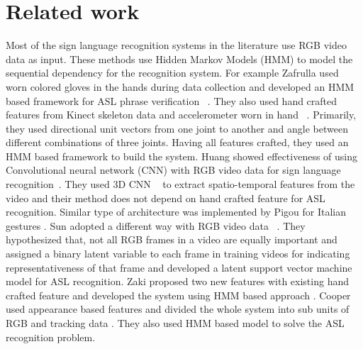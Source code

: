 \documentclass[10pt,twocolumn,letterpaper]{article}
\begin{document}
\section{Related work}
Most of the sign language recognition systems in the literature use RGB video data as input. These methods use Hidden Markov Models (HMM) to model the sequential dependency for the recognition system. For example Zafrulla \etal used worn colored gloves in the hands during data collection and developed an HMM based framework for ASL phrase verification ~\cite{copycat_zafrulla}. They also used hand crafted features from Kinect skeleton data and accelerometer worn in hand ~\cite{Zafrulla:2011:ASL:2070481.2070532}. Primarily, they used directional unit vectors from one joint to another and angle between different combinations of three joints. Having all features crafted, they used an HMM based framework to build the system. Huang \etal showed effectiveness of using Convolutional neural network (CNN) with RGB video data for sign language recognition~\cite{7177428}. They used 3D CNN ~\cite{Ji:2013:CNN:2412386.2412939} to extract spatio-temporal features from the video and their method does not depend on hand crafted feature for ASL recognition. Similar type of architecture was implemented by Pigou \etal for Italian gestures \cite{978-3-319-16178-5_40}. Sun \etal adopted a different way with RGB video data ~\cite{Sun:2015:LSV:2753829.2629481}. They hypothesized that, not all RGB frames in a video are equally important and assigned a binary latent variable to each frame in training videos for indicating representativeness of that frame and developed a latent support vector machine model for ASL recognition. Zaki \etal proposed two new features with existing hand crafted feature and developed the system using HMM based approach \cite{ZAKI2011572}. Cooper \etal used appearance based features and divided the whole system into sub units of RGB and tracking data \cite{Cooper2017}. They also used HMM based model to solve the ASL recognition problem. 
\end{document}
